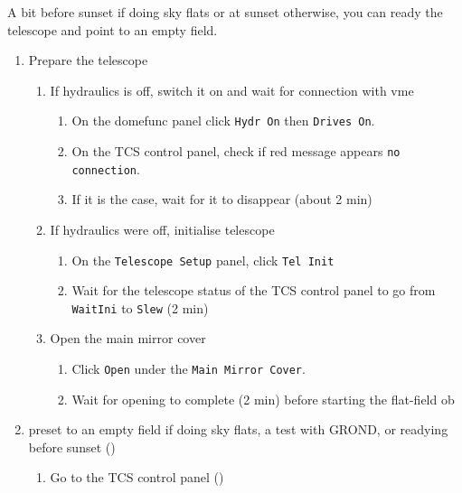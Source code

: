 \documentclass[11pt,fleqn,a4paper]{book}
\begin{document}
A bit before sunset if doing \gls{sky flats} or at sunset otherwise, you can ready the telescope and point to an empty field.

\label{proc:ready}
\begin{enumerate}
\item Prepare the telescope
         \begin{enumerate}
            \item If hydraulics is off, switch it on and wait for connection with \gls{vme} 
                \begin{enumerate}
                    \item On the \gls{domefunc} panel click \texttt{Hydr On} then \texttt{Drives On}.
                    \item On the \gls{TCS control panel}, check if red message appears  \texttt{no connection}.
                    \item If it is the case, wait for it to disappear (about 2 min)
                \end{enumerate}
            \item If hydraulics were off, initialise telescope
                \begin{enumerate}
                    \item On the \texttt{Telescope Setup} panel, click \texttt{Tel Init}
                    \item Wait for the telescope status of  the \gls{TCS control panel} to go from \texttt{WaitIni} to \texttt{Slew} (2 min)
                \end{enumerate}
	\item\label{list:mirropen}Open the \gls{main mirror} cover
            \begin{enumerate}
               \item Click \texttt{Open} under the \texttt{Main Mirror Cover}.
               \item Wait for opening to complete (2 min) before starting the flat-field \gls{ob}
            \end{enumerate}
        \end{enumerate}
        \item \Gls{preset} to an empty field if doing \gls{sky flats}, a test with GROND, or readying before sunset ()
               \label{list:presetempty}         
            \begin{enumerate}
            \item Go to the \gls{TCS control panel} () 

\end{enumerate}
\end{enumerate}
\end{document}
